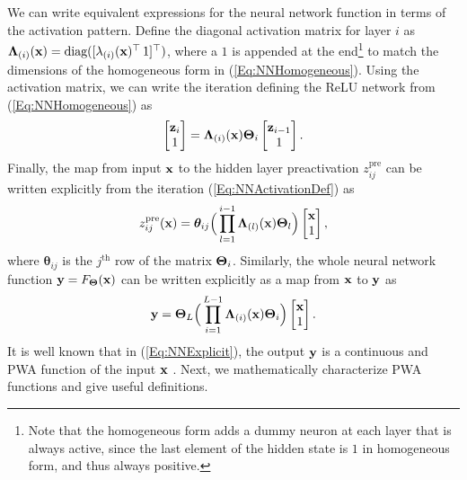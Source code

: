 We can write equivalent expressions for the neural network function in terms of the activation pattern.  Define the diagonal activation matrix for layer $i$ as $\mathbf{\Lambda}_{(i)}(\mathbf{x}) = \text{diag}([\mathbf{\lambda}_{(i)}(\mathbf{x})^\top \, 1]^\top)$, where a $1$ is appended at the end\footnote{Note that the homogeneous form adds a dummy neuron at each layer that is always active, since the last element of the hidden state is $1$ in homogeneous form, and thus always positive.} to match the dimensions of the homogeneous form in (\ref{Eq:NNHomogeneous}). Using the activation matrix, we can write the iteration defining the ReLU network from (\ref{Eq:NNHomogeneous}) as
\begin{align}
    \label{Eq:NNActivationDef}
    \begin{bmatrix}
    \mathbf{z}_i\\
    1
    \end{bmatrix}
     = \mathbf{\Lambda}_{(i)}(\mathbf{x})\mathbf{\Theta}_i\begin{bmatrix} \mathbf{z}_{i-1}\\
    1
    \end{bmatrix}.
\end{align}
Finally, the map from input $\mathbf{x}$ to the hidden layer preactivation $z_{ij}^\text{pre}$ can be written explicitly from the iteration (\ref{Eq:NNActivationDef}) as 
\begin{align}
\label{Eq:PreActExplicit}
    z_{ij}^\text{pre}(\mathbf{x}) = \boldsymbol{\theta}_{ij}\Big(\prod_{l = 1}^{i-1}\mathbf{\Lambda}_{(l)}(\mathbf{x})\mathbf{\Theta}_l\Big)\begin{bmatrix} \mathbf{x}\\
    1
    \end{bmatrix},
\end{align}
where $\boldsymbol{\theta}_{ij}$ is the $j^{\text{th}}$ row of the matrix $\mathbf{\Theta}_i$. Similarly, the whole neural network function $\mathbf{y} = F_{\mathbf{\Theta}}(\mathbf{x})$ can be written explicitly as a map from $\mathbf{x}$ to $\mathbf{y}$ as
\begin{align}
\label{Eq:NNExplicit}
    \mathbf{y} = \mathbf{\Theta}_L\Big(\prod_{i = 1}^{L-1}\mathbf{\Lambda}_{(i)}(\mathbf{x})\mathbf{\Theta}_i\Big)\begin{bmatrix} \mathbf{x}\\
    1
    \end{bmatrix}.
\end{align}
It is well known that in  (\ref{Eq:NNExplicit}), the output $\mathbf{y}$ is a continuous and PWA function of the input $\mathbf{x}$ \cite{bengio,Hanin_2019,understanding}.  Next, we mathematically characterize PWA functions and give useful definitions.

